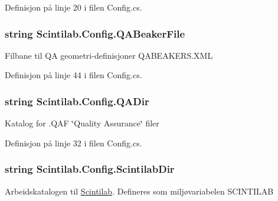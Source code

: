 Definisjon på linje 20 i filen Config.\+cs.

\hypertarget{class_scintilab_1_1_config_a732e164c0f203b6dfccd10dd3081289d}{
\subsubsection[{Q\+A\+Beaker\+File}]{\setlength{\rightskip}{0pt plus 5cm}string Scintilab.\+Config.\+Q\+A\+Beaker\+File\hspace{0.3cm}{\ttfamily [static]}}}\label{class_scintilab_1_1_config_a732e164c0f203b6dfccd10dd3081289d}
Filbane til Q\+A geometri-\/definisjoner Q\+A\+B\+E\+A\+K\+E\+R\+S.\+X\+M\+L 

Definisjon på linje 44 i filen Config.\+cs.

\hypertarget{class_scintilab_1_1_config_ae7e1416a22380f4b5825e0ab9e49ee43}{
\subsubsection[{Q\+A\+Dir}]{\setlength{\rightskip}{0pt plus 5cm}string Scintilab.\+Config.\+Q\+A\+Dir\hspace{0.3cm}{\ttfamily [static]}}}\label{class_scintilab_1_1_config_ae7e1416a22380f4b5825e0ab9e49ee43}
Katalog for .Q\+A\+F \char`\"{}\+Quality Assurance\char`\"{} filer 

Definisjon på linje 32 i filen Config.\+cs.

\hypertarget{class_scintilab_1_1_config_a64f1560197ddefe3f0e43bd620dd72c8}{
\subsubsection[{Scintilab\+Dir}]{\setlength{\rightskip}{0pt plus 5cm}string Scintilab.\+Config.\+Scintilab\+Dir\hspace{0.3cm}{\ttfamily [static]}}}\label{class_scintilab_1_1_config_a64f1560197ddefe3f0e43bd620dd72c8}
Arbeidskatalogen til \hyperlink{namespace_scintilab}{Scintilab}. Defineres som miljøvariabelen S\+C\+I\+N\+T\+I\+L\+A\+B 

